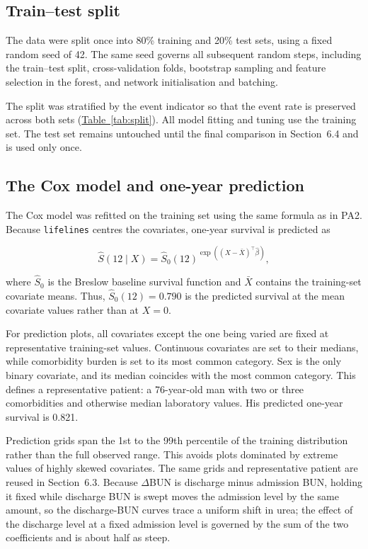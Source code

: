 \documentclass[11pt,a4paper]{article}
\newcommand{\tabref}[1]{\hyperref[#1]{Table~\ref*{#1}}}
\newcommand{\dbun}{$\Delta$BUN}
\begin{document}
\subsection{Train--test split}

The data were split once into 80\% training and 20\% test sets, using a fixed random seed of 42. The same seed governs all subsequent random steps, including the train--test split, cross-validation folds, bootstrap sampling and feature selection in the forest, and network initialisation and batching.

The split was stratified by the event indicator so that the event rate is preserved across both sets (\tabref{tab:split}). All model fitting and tuning use the training set. The test set remains untouched until the final comparison in Section~6.4 and is used only once. 

\subsection{The Cox model and one-year prediction}

The Cox model was refitted on the training set using the same formula as in PA2. Because \texttt{lifelines} centres the covariates, one-year survival is predicted as

$$
  \hat S(12 \mid X) = \hat S_0(12)^{\exp\left((X - \bar X)^{\top} \hat\beta\right)},
$$

where $\hat S_0$ is the Breslow baseline survival function and $\bar X$ contains the training-set covariate means. Thus, $\hat S_0(12) = 0.790$ is the predicted survival at the mean covariate values rather than at $X=0$.

For prediction plots, all covariates except the one being varied are fixed at representative training-set values. Continuous covariates are set to their medians, while comorbidity burden is set to its most common category. Sex is the only binary covariate, and its median coincides with the most common category. This defines a representative patient: a 76-year-old man with two or three comorbidities and otherwise median laboratory values. His predicted one-year survival is 0.821.

Prediction grids span the 1st to the 99th percentile of the training distribution rather than the full observed range. This avoids plots dominated by extreme values of highly skewed covariates. The same grids and representative patient are reused in Section~6.3. Because \dbun{} is discharge minus admission BUN, holding it fixed while discharge BUN is swept moves the admission level by the same amount, so the discharge-BUN curves trace a uniform shift in urea; the effect of the discharge level at a fixed admission level is governed by the sum of the two coefficients and is about half as steep.
\end{document}
